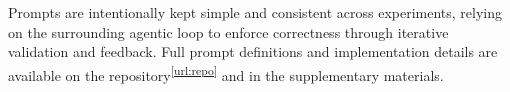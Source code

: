 \documentclass[runningheads]{llncs}
\newenvironment{inlinelist}{\begin{enumerate*}[label=\emph{(\roman*)}]}{\end{enumerate*}}
\newcommand{\ourapproach}[0]{\textsc{AGE-ML}}
\begin{document}
Prompts are intentionally kept simple and consistent across experiments,
relying on the surrounding agentic loop to enforce correctness through iterative validation and feedback.
%
Full prompt definitions and implementation details are available on the repository\textsuperscript{\ref{url:repo}}
and in the supplementary materials.



\end{document}
